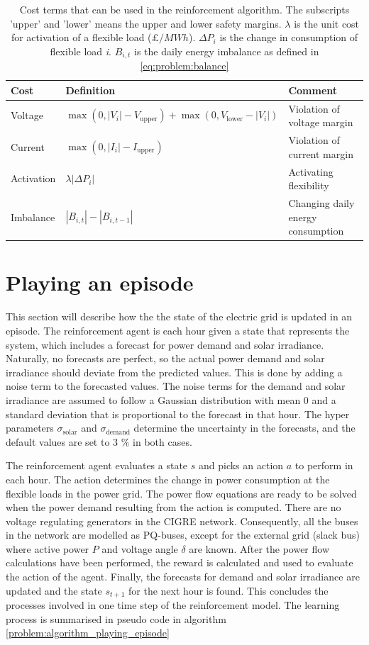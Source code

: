 \documentclass[class=book, crop=false, 11pt]{standalone}
\begin{document}
\begin{table}[ht]
\centering
\caption{Cost terms that can be used in the reinforcement algorithm. The subscripts 'upper' and 'lower' means the upper and lower safety margins. $\lambda$ is the unit cost for activation of a flexible load ($\pounds/MWh$). $\Delta P_{i}$ is the change in consumption of flexible load \textit{i}. $B_{i,t}$ is the daily energy imbalance as defined in \eqref{eq:problem:balance}}
\label{table:reward_terms}
\begin{tabular}{l|ll}

Cost  & Definition & Comment
\\ 
\hline
Voltage &
$\max(0,|V_{i}| - V_{\textrm{upper}}) + \max(0,V_{\textrm{lower}}- |V_{i}|)$ &
Violation of voltage margin
\\
Current &
$\max(0,|I_{i}| - I_{\textrm{upper}})$&
Violation of current margin
\\
Activation &
$\lambda |\Delta P_{i}|$&
Activating flexibility
\\
Imbalance &
$|B_{i,t}|- |B_{i,t-1}|$&
\makecell[l]{Changing daily energy \\consumption}
\\
\hline
\end{tabular}
\end{table}

\section{Playing an episode}
This section will describe how the the state of the electric grid is updated in an episode. The reinforcement agent is each hour given a state that represents the system, which includes a forecast for power demand and solar irradiance. Naturally, no forecasts are perfect, so the actual power demand and solar irradiance should deviate from the predicted values. This is done by adding a noise term to the forecasted values. The noise terms for the demand and solar irradiance are assumed to follow a Gaussian distribution with mean 0 and a standard deviation that is proportional to the forecast in that hour. The hyper parameters $\sigma_{\textrm{solar}}$ and $\sigma_{\textrm{demand}}$ determine the uncertainty in the forecasts, and the default values are set to 3 \% in both cases.

The reinforcement agent evaluates a state $s$ and picks an action $a$ to perform in each hour. The action determines the change in power consumption at the flexible loads in the power grid. The power flow equations are ready to be solved when the power demand resulting from the action is computed. There are no voltage regulating generators in the CIGRE network. Consequently, all the buses in the network are modelled as PQ-buses, except for the external grid (slack bus) where active power $P$ and voltage angle $\delta$ are known. After the power flow calculations have been performed, the reward is calculated and used to evaluate the action of the agent. Finally, the forecasts for demand and solar irradiance are updated and the state $s_{t+1}$ for the next hour is found. This concludes the processes involved in one time step of the reinforcement model. The learning process is summarised in pseudo code in algorithm \ref{problem:algorithm_playing_episode} 
\end{document}
